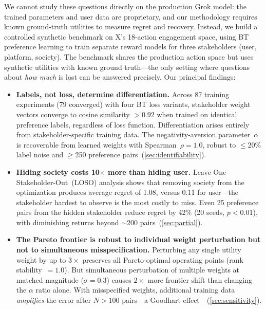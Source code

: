\documentclass[11pt,letterpaper]{article}
\newcommand{\numexp}{87}
\newcommand{\numconv}{79}
\newcommand{\costhresh}{0.92}
\newcommand{\alphaspearman}{1.0}
\begin{document}
We cannot study these questions directly on the production Grok model:
the trained parameters and user data are proprietary, and our
methodology requires known ground-truth utilities to measure regret
and recovery. Instead, we build a controlled synthetic benchmark on
X's 18-action engagement space, using BT preference learning to
train separate reward models for three stakeholders (user, platform,
society). The benchmark shares the production action space but uses
synthetic utilities with known ground truth---the only setting where
questions about \emph{how much} is lost can be answered precisely.
Our principal findings:

\begin{itemize}
  \item \textbf{Labels, not loss, determine differentiation.} Across
    \numexp{} training experiments (\numconv{} converged) with four BT
    loss variants, stakeholder weight vectors converge to cosine
    similarity $>\costhresh$ when trained on identical preference
    labels, regardless of loss function. Differentiation arises
    entirely from stakeholder-specific training data. The
    negativity-aversion parameter~$\alpha$ is recoverable from learned
    weights with Spearman~$\rho = \alphaspearman$, robust to
    $\leq$20\% label noise and $\geq$250 preference
    pairs~(\cref{sec:identifiability}).

  \item \textbf{Hiding society costs 10$\times$ more than hiding
    user.} Leave-One-Stakeholder-Out~(LOSO) analysis shows that
    removing society from the optimization produces average regret of
    1.08, versus 0.11 for user---the stakeholder hardest to observe
    is the most costly to miss. Even 25 preference pairs from the
    hidden stakeholder reduce regret by 42\% (20 seeds, $p < 0.01$),
    with diminishing returns beyond $\sim$200
    pairs~(\cref{sec:partial}).

  \item \textbf{The Pareto frontier is robust to individual weight
    perturbation but not to simultaneous misspecification.} Perturbing
    any single utility weight by up to $3\times$ preserves all
    Pareto-optimal operating points (rank stability~$= 1.0$). But
    simultaneous perturbation of multiple weights at matched magnitude
    ($\sigma = 0.3$) causes $2\times$ more frontier shift than
    changing the $\alpha$ ratio alone. With misspecified weights,
    additional training data \emph{amplifies} the error after
    $N > 100$ pairs---a Goodhart
    effect~\cite{skalse2024goodhart}~(\cref{sec:sensitivity}).
\end{itemize}
\end{document}
